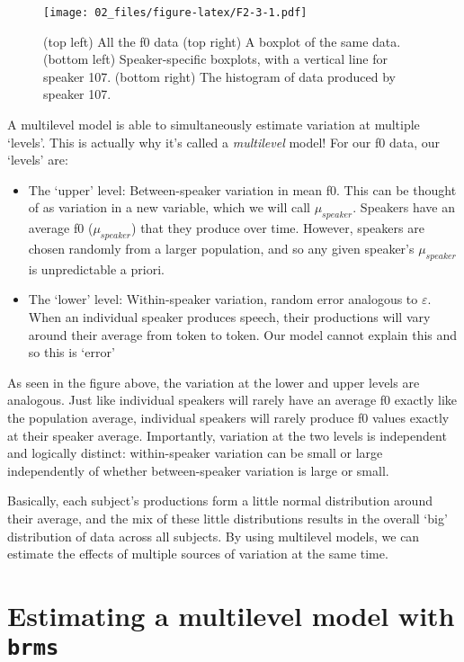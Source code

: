 \documentclass[
]{book}
\begin{document}
\begin{figure}
\centering
\texttt{[image: 02\_files/figure-latex/F2-3-1.pdf]}
\caption{\label{fig:F2-3}(top left) All the f0 data (top right) A boxplot of the same data. (bottom left) Speaker-specific boxplots, with a vertical line for speaker 107. (bottom right) The histogram of data produced by speaker 107.}
\end{figure}

A multilevel model is able to simultaneously estimate variation at multiple `levels'. This is actually why it's called a \emph{multilevel} model! For our f0 data, our `levels' are:

\begin{itemize}
\item
  The `upper' level: Between-speaker variation in mean f0. This can be thought of as variation in a new variable, which we will call \(\mu_{speaker}\). Speakers have an average f0 (\(\mu_{speaker}\)) that they produce over time. However, speakers are chosen randomly from a larger population, and so any given speaker's \(\mu_{speaker}\) is unpredictable a priori.
\item
  The `lower' level: Within-speaker variation, random error analogous to \(\varepsilon\). When an individual speaker produces speech, their productions will vary around their average from token to token. Our model cannot explain this and so this is `error'
\end{itemize}

As seen in the figure above, the variation at the lower and upper levels are analogous. Just like individual speakers will rarely have an average f0 exactly like the population average, individual speakers will rarely produce f0 values exactly at their speaker average. Importantly, variation at the two levels is independent and logically distinct: within-speaker variation can be small or large independently of whether between-speaker variation is large or small.

Basically, each subject's productions form a little normal distribution around their average, and the mix of these little distributions results in the overall `big' distribution of data across all subjects. By using multilevel models, we can estimate the effects of multiple sources of variation at the same time.

\hypertarget{estimating-a-multilevel-model-with-brms}{%
\section{\texorpdfstring{Estimating a multilevel model with \texttt{brms}}{Estimating a multilevel model with brms}}\label{estimating-a-multilevel-model-with-brms}}
\end{document}
